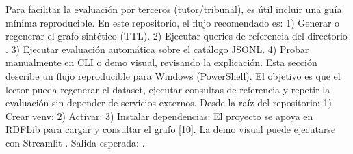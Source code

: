 {}\markdownRendererInterblockSeparator
{}Para facilitar la evaluación por terceros (tutor/tribunal), es útil incluir una guía mínima reproducible. En este repositorio, el flujo recomendado es:\markdownRendererInterblockSeparator
{}1) Generar o regenerar el grafo sintético (TTL). 2) Ejecutar queries de referencia del directorio . 3) Ejecutar evaluación automática sobre el catálogo JSONL. 4) Probar manualmente en CLI o demo visual, revisando la explicación.\markdownRendererInterblockSeparator
{}Esta sección describe un flujo reproducible para Windows (PowerShell). El objetivo es que el lector pueda regenerar el dataset, ejecutar consultas de referencia y repetir la evaluación sin depender de servicios externos.\markdownRendererInterblockSeparator
{} Desde la raíz del repositorio:\markdownRendererInterblockSeparator
{}1) Crear venv:\markdownRendererInterblockSeparator
{}\markdownRendererUlBeginTight
\markdownRendererUlItem {}\markdownRendererUlItemEnd 
\markdownRendererUlEndTight \markdownRendererInterblockSeparator
{}2) Activar:\markdownRendererInterblockSeparator
{}\markdownRendererUlBeginTight
\markdownRendererUlItem {}\markdownRendererUlItemEnd 
\markdownRendererUlEndTight \markdownRendererInterblockSeparator
{}3) Instalar dependencias:\markdownRendererInterblockSeparator
{}\markdownRendererUlBeginTight
\markdownRendererUlItem {}\markdownRendererUlItemEnd 
\markdownRendererUlEndTight \markdownRendererInterblockSeparator
{}El proyecto se apoya en RDFLib para cargar y consultar el grafo [10]. La demo visual puede ejecutarse con Streamlit .\markdownRendererInterblockSeparator
{}\markdownRendererInterblockSeparator
{}\markdownRendererUlBeginTight
\markdownRendererUlItem {}\markdownRendererUlItemEnd 
\markdownRendererUlEndTight \markdownRendererInterblockSeparator
{}Salida esperada: .\markdownRendererInterblockSeparator
{}\markdownRendererInterblockSeparator
